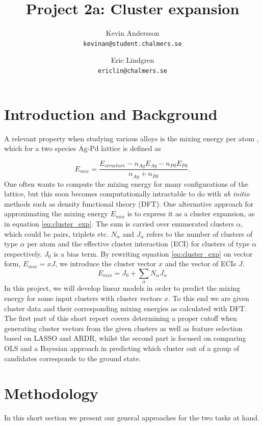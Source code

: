 \documentclass[11pt,a4paper]{article}
\title{Project 2a: Cluster expansion}
\author{
  Kevin Andersson\\
  \texttt{kevinan@student.chalmers.se}
  \and
   Eric Lindgren\\
  \texttt{ericlin@chalmers.se}
}
\begin{document}
\maketitle

\setcounter{page}{1}
\section{Introduction and Background}

A relevant property when studying various alloys is the mixing energy per atom \cite{project_pm}, which for a two species Ag-Pd lattice is defined as 

\begin{equation*}
    E_{mix} = \frac{E_{structure} - n_{Ag}E_{Ag} - n_{Pd}E_{Pd}}{n_{Ag} + n_{Pd}}.
\end{equation*}
One often wants to compute the mixing energy for many configurations of the lattice, but this soon becomes computationally intractable to do with \textit{ab initio} methods such as density functional theory (DFT). One alternative approach for approximating the mixing energy $E_{mix}$ is to express it as a cluster expansion, as in equation \eqref{eq:cluster_exp}. The sum is carried over enumerated clusters $\alpha$, which could be pairs, triplets etc. $N_\alpha$ and $J_\alpha$ refers to the number of clusters of type $\alpha$ per atom and the effective cluster interaction (ECI) for clusters of type $\alpha$ respectively. $J_0$ is a bias term. By rewriting equation \eqref{eq:cluster_exp} on vector form, $E_{mix} = xJ$, we introduce the cluster vector $x$ and the vector of ECIs $J$.
\begin{equation}
    \label{eq:cluster_exp}
    E_{mix} = J_0 + \sum_\alpha N_\alpha J_\alpha
\end{equation}
In this project, we will develop linear models in order to predict the mixing energy for some input clusters with cluster vectors $x$. To this end we are given cluster data and their corresponding mixing energies as calculated with DFT. The first part of this short report covers determining a proper cutoff when generating cluster vectors from the given clusters as well as feature selection based on LASSO and ARDR, whilst the second part is focused on comparing OLS and a Bayesian approach in predicting which cluster out of a group of candidates corresponds to the ground state.

\section{Methodology}
In this short section we present our general approaches for the two tasks at hand.
\end{document}
